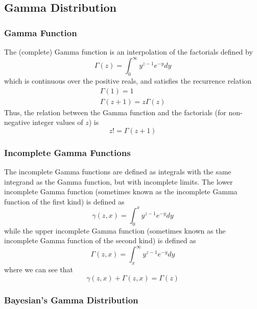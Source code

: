 \documentclass[11pt]{report} %
\begin{document}
\subsection{Gamma Distribution}

\subsubsection{Gamma Function}

The (complete) Gamma function is an interpolation of the factorials defined by
\begin{equation}
\Gamma\left(z\right) = \int_{0}^{\infty}y^{z - 1}e^{-y}dy
\end{equation}
which is continuous over the positive reals, and satisfies the recurrence relation
\begin{gather}
\Gamma\left(1\right) = 1 \\
\Gamma\left(z + 1\right) = z\Gamma\left(z\right)
\end{gather}
Thus, the relation between the Gamma function and the factorials (for non-negative integer values of $z$) is
\begin{equation}
z! = \Gamma\left(z + 1\right)
\end{equation}

\subsubsection{Incomplete Gamma Functions}

The incomplete Gamma functions are defined as integrals with the same integrand as the Gamma function, but with incomplete limits. The lower incomplete Gamma function (sometimes known as the incomplete Gamma function of the first kind) is defined as
\begin{equation}
\gamma\left(z, x\right) = \int_{0}^{x}y^{z - 1}e^{-y}dy
\end{equation}
while the upper incomplete Gamma function (sometimes known as the incomplete Gamma function of the second kind) is defined as
\begin{equation}
\Gamma\left(z, x\right) = \int_{x}^{\infty}y^{z - 1}e^{-y}dy
\end{equation}
where we can see that
\begin{equation}
\gamma\left(z, x\right) + \Gamma\left(z, x\right) = \Gamma\left(z\right)
\end{equation}

\subsubsection{Bayesian's Gamma Distribution}
\end{document}
